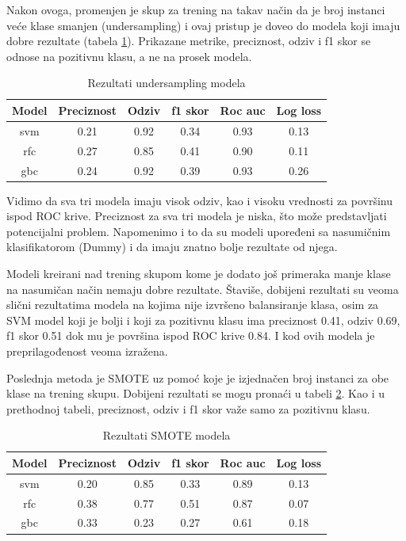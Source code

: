 \documentclass[a4paper]{article}
\begin{document}
Nakon ovoga, promenjen je skup za trening na takav način da je broj instanci
veće klase smanjen (undersampling) i ovaj pristup je doveo do modela koji imaju dobre rezultate (tabela \ref{tab:undersampling_pg}). Prikazane metrike, preciznost, odziv i f1 skor se odnose na pozitivnu klasu, a ne na prosek modela.

\begin{table}[!h]
\begin{center}
\begin{tabular}{|c|c|c|c|c|c|} \hline
\textbf{Model} & \textbf{Preciznost} & \textbf{Odziv} & \textbf{f1 skor} & \textbf{Roc auc} & \textbf{Log loss} \\ \hline
svm & 0.21 & 0.92 & 0.34 & 0.93 & 0.13 \\ \hline
rfc & 0.27 & 0.85 & 0.41 & 0.90 & 0.11 \\ \hline
gbc & 0.24 & 0.92 & 0.39 & 0.93 & 0.26 \\ \hline
\end{tabular}
\caption{Rezultati undersampling modela}
\label{tab:undersampling_pg}
\end{center}
\end{table}

Vidimo da sva tri modela imaju visok odziv, kao i visoku vrednosti za površinu ispod ROC krive. Preciznost za sva tri modela je niska, što može predstavljati potencijalni problem. Napomenimo i to da su modeli upoređeni sa nasumičnim klasifikatorom (Dummy) i da imaju znatno bolje rezultate od njega.

Modeli kreirani nad trening skupom kome je dodato još primeraka manje
klase na nasumičan način nemaju dobre rezultate. Štaviše, dobijeni rezultati
su veoma slični rezultatima modela na kojima nije izvršeno balansiranje klasa,
osim za SVM model koji je bolji i koji za pozitivnu klasu ima preciznost 0.41,
odziv 0.69, f1 skor 0.51 dok mu je površina ispod ROC krive 0.84. I kod ovih modela je preprilagođenost veoma izražena.

Poslednja metoda je SMOTE uz pomoć koje je izjednačen broj instanci za obe klase na
trening skupu. Dobijeni rezultati se mogu pronaći u tabeli \ref{tab:smote_pg}. Kao i u prethodnoj tabeli, preciznost, odziv i f1 skor važe samo za pozitivnu klasu.

\begin{table}[!h]
\begin{center}
\begin{tabular}{|c|c|c|c|c|c|} \hline
\textbf{Model} & \textbf{Preciznost} & \textbf{Odziv} & \textbf{f1 skor} & \textbf{Roc auc} & \textbf{Log loss} \\ \hline
svm & 0.20 & 0.85 & 0.33 & 0.89 & 0.13 \\ \hline
rfc & 0.38 & 0.77 & 0.51 & 0.87 & 0.07 \\ \hline
gbc & 0.33 & 0.23 & 0.27 & 0.61 & 0.18 \\ \hline
\end{tabular}
\caption{Rezultati SMOTE modela}
\label{tab:smote_pg}
\end{center}
\end{table}
\end{document}
